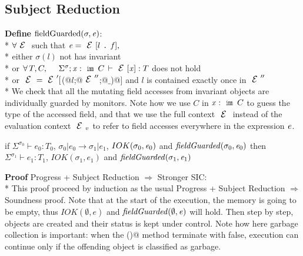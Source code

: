 \subsection{Subject Reduction}

\noindent\textbf{Define} $\text{fieldGuarded}(\sigma,\e)$:\\*
${}_{}$\quad\quad$\forall \ctx$ such that $\e=\ctx[l\singleDot\f], $\\*
${}_{}$\quad\quad\quad either $\sigma(l)$ not has invariant\\*
${}_{}$\quad\quad\quad or $\forall\, T,C,\quad\ \Sigma^\sigma;\x:\Kw{imm}\,C\,\vdash\ctx[\x]:T$ does not hold\\*
${}_{}$\quad\quad\quad or $\ctx=\ctx'[$\Q@M(@$l$\Q@;@$\ctx''$\Q@;@$\_$\Q@)@$]$ and $l$ is contained exactly once in $\ctx''$ \\*
\noindent We check that all the mutating field accesses
from invariant objects are individually guarded by monitors.
Note how we use $C$ in $\x:\Kw{imm}\,C$ to guess the type of the accessed field,
and that we use the full context $\ctx$ instead of the evaluation context $\ctx_v$
to refer to field accesses everywhere in the expression ${\mathit{e}}$.



\begin{Theorem}
if $\Sigma^{\sigma_0}\vdash e_0: T_0$,
$\sigma_0|e_0\rightarrow \sigma_1|e_1$,
$IOK(\sigma_0,\e_0)$
and
$\mathit{fieldGuarded}(\sigma_0,\e_0)$
then
$\Sigma^{\sigma_1}\vdash e_1: T_1$,
$IOK(\sigma_1,e_1)$ and
$\mathit{fieldGuarded}(\sigma_1,\e_1)$
\end{Theorem}

\noindent\textbf{Proof }Progress + Subject Reduction $\Rightarrow$ Stronger SIC:\\*
This proof proceed by induction as the usual Progress + Subject Reduction $\Rightarrow$ Soundness
proof.
Note that at the start of the execution, the memory is going to be empty, thus
$IOK(\emptyset,e)$  and $\mathit{fieldGuarded}(\emptyset,{\mathit{e}})$
will hold.
Then step by step, objects are created and their status is kept under control.
Note how here garbage collection is important: 
when the \Q@invariant()@ method terminate with false, 
execution can continue only if the offending object is classified as garbage.

